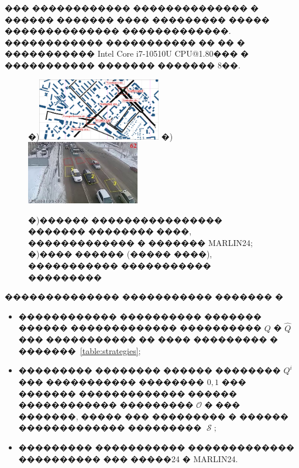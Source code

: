 \documentclass[11pt]{ubs}
\DeclareMathOperator{\state}{\mathcal{S}}
\begin{document}
\label{par:computation}

��� ������������ �������������� � ������ ������� ���� ��������� ����� �������������� �������������. ������������ ����������� �� �� � ����������� Intel Core i7-10510U CPU@1.80��� � ����������� ������� ������� 8��.
\begin{figure}[tbph]
  \centering
  �)\includegraphics[width = 0.48\textwidth]{model_ex.pdf}
  �)\includegraphics[width = 0.44\textwidth]{SV-GOD_123.jpg}
  \caption{�)������ ���������������� ������� �������� ����, ������������� � ������� MARLIN24; �)���� ������ (����� ����), ����������� ����������� ���������}
  \label{fig:ex3}
\end{figure}

\newpage
�������������� ����������� ������� �
\begin{itemize}[itemsep=-5pt]
  \item ������������ ���������� ������� ������ ������������� ���������� $Q$ � $\hat{Q}$ ��� ����������� �� ���� ��������� � �������~\ref{table:strategies};
  \item ��������� �������� ������ �������� $Q^i$ ��� ����������� �������� $0,1$ ��� ������� ������������� ������ ������������ ��������� $\mathcal{O}$ � ��� �������, ����� ��� ��������� � ������ ������������� ��������� $\mathbf{\state};$
  \item ��������� ����������� ������������� ���������� ��� �����24 � MARLIN24.
\end{itemize}
\end{document}
